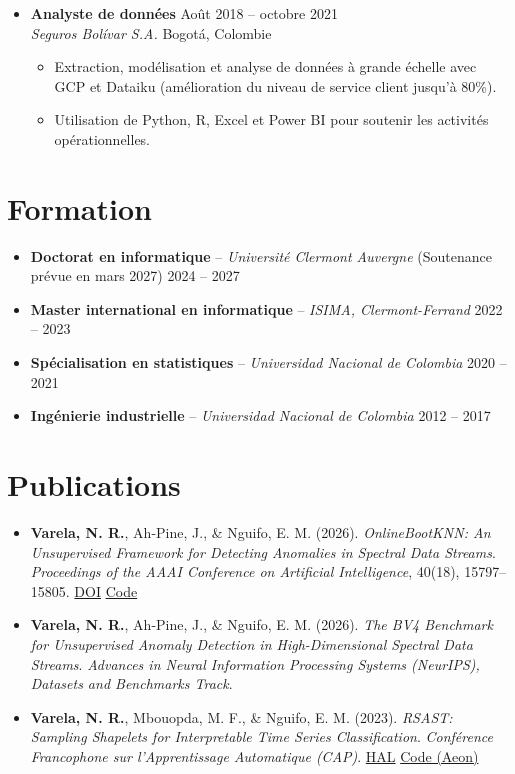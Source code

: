 \documentclass[12pt,a4paper]{article}
\begin{document}
\begin{itemize}
\item \textbf{Analyste de données} \hfill Août 2018 -- octobre 2021\\
\textit{Seguros Bolívar S.A.} \hfill Bogotá, Colombie
\begin{itemize}
\item Extraction, modélisation et analyse de données à grande échelle avec GCP et Dataiku (amélioration du niveau de service client jusqu'à 80\%).
\item Utilisation de Python, R, Excel et Power BI pour soutenir les activités opérationnelles.
\end{itemize}
\end{itemize}

\section*{Formation}
\begin{itemize}
\item \textbf{Doctorat en informatique} -- \textit{Université Clermont Auvergne} (Soutenance prévue en mars 2027) \hfill 2024 -- 2027
\item \textbf{Master international en informatique} -- \textit{ISIMA, Clermont-Ferrand} \hfill 2022 -- 2023
\item \textbf{Spécialisation en statistiques} -- \textit{Universidad Nacional de Colombia} \hfill 2020 -- 2021
\item \textbf{Ingénierie industrielle} -- \textit{Universidad Nacional de Colombia} \hfill 2012 -- 2017
\end{itemize}

\section*{Publications}
\begin{itemize}
\item \textbf{Varela, N. R.}, Ah-Pine, J., \& Nguifo, E. M. (2026). \textit{OnlineBootKNN: An Unsupervised Framework for Detecting Anomalies in Spectral Data Streams}. \textit{Proceedings of the AAAI Conference on Artificial Intelligence}, 40(18), 15797--15805. \href{https://doi.org/10.1609/aaai.v40i18.38611}{DOI} \textbar{} \href{https://github.com/nirojasva/spectral-benchmark}{Code}
\item \textbf{Varela, N. R.}, Ah-Pine, J., \& Nguifo, E. M. (2026). \textit{The BV4 Benchmark for Unsupervised Anomaly Detection in High-Dimensional Spectral Data Streams}. \textit{Advances in Neural Information Processing Systems (NeurIPS), Datasets and Benchmarks Track}.
\item \textbf{Varela, N. R.}, Mbouopda, M. F., \& Nguifo, E. M. (2023). \textit{RSAST: Sampling Shapelets for Interpretable Time Series Classification}. \textit{Conférence Francophone sur l'Apprentissage Automatique (CAP)}. \href{https://hal.science/hal-04311309/}{HAL} \textbar{} \href{https://www.aeon-toolkit.org/en/v1.1.0/api_reference/auto_generated/aeon.transformations.collection.shapelet_based.RSAST.html}{Code (Aeon)}
\end{itemize}
\end{document}
